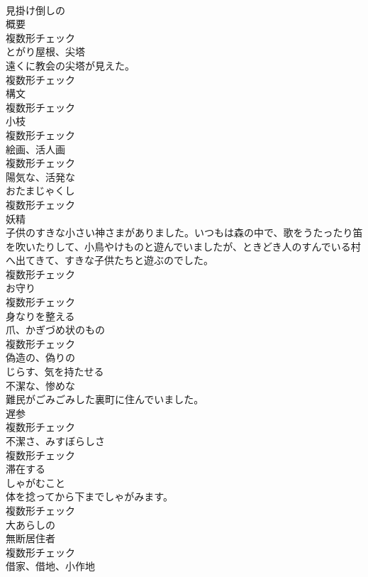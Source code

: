 \documentclass[8pt]{extreport}
\begin{document}
\begin{CJK}{UTF8}{min}
\\	[形容詞]	見掛け倒しの	
\\	[名詞]	概要	
\\	複数形チェック
\\	[名詞]	とがり屋根、尖塔	
\\	遠くに教会の尖塔が見えた。	
\\	複数形チェック
\\	[名詞]	構文	
\\	複数形チェック
\\	[名詞]	小枝	
\\	複数形チェック
\\	[名詞]	絵画、活人画	
\\	複数形チェック
\\	[形容詞]	陽気な、活発な	
\\	[名詞]	おたまじゃくし	
\\	複数形チェック
\\	[名詞]	妖精	
\\	子供のすきな小さい神さまがありました。いつもは森の中で、歌をうたったり笛を吹いたりして、小鳥やけものと遊んでいましたが、ときどき人のすんでいる村へ出てきて、すきな子供たちと遊ぶのでした。	
\\	複数形チェック
\\	[名詞]	お守り	
\\	複数形チェック
\\	[動詞]	身なりを整える	
\\	[名詞]	爪、かぎづめ状のもの	
\\	複数形チェック
\\	[形容詞]	偽造の、偽りの	
\\	[動詞]	じらす、気を持たせる	
\\	[形容詞]	不潔な、惨めな	
\\	難民がごみごみした裏町に住んでいました。	
\\	[名詞]	遅参	
\\	複数形チェック
\\	[名詞]	不潔さ、みすぼらしさ	
\\	複数形チェック
\\	[動詞]	滞在する	
\\	[名詞]	しゃがむこと	
\\	体を捻ってから下までしゃがみます。	
\\	複数形チェック
\\	[形容詞]	大あらしの	
\\	[名詞]	無断居住者	
\\	複数形チェック
\\	[名詞]	借家、借地、小作地	

\end{CJK}
\end{document}
